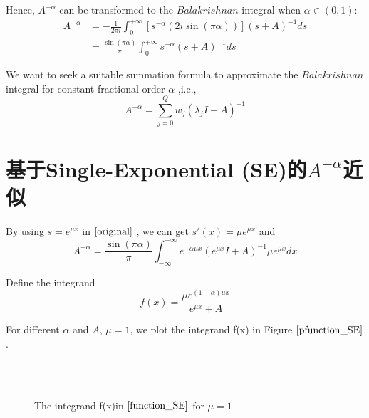 Hence, $A^{-\alpha}$ can be transformed to the $Balakrishnan$  integral \cite{Balakrishnan1960FractionalPO} when $\alpha \in(0,1)$:
\begin{equation}
	\begin{aligned}
	A^{-\alpha}& =-\frac{1}{2 \pi i} \int_{0}^{+\infty}[s^{-\alpha}(2 i \sin(\pi\alpha))](s+A)^{-1} d s\\
	& =\frac{\sin(\pi \alpha)}{\pi} \int_{0}^{+\infty} s^{-\alpha}(s+A)^{-1} d s
\label{original}
\end{aligned}
\end{equation}

We want to seek a suitable summation formula to approximate the  $Balakrishnan$  integral for constant fractional order $\alpha$ ,i.e.,
\begin{equation}
{A}^{-\alpha}=\sum_{j=0}^{Q}w_j(\lambda_jI+A)^{-1}
\end{equation}


\section{基于Single-Exponential (SE)的$A^{-\alpha}$近似}


By using  $s=e^{\mu x}$ in $\eqref{original}$\cite{Harizanov2020ASO} , we can get $s'(x)=\mu e^{\mu x}$ and
\begin{equation}
{A}^{-\alpha}=\frac{\sin(\pi \alpha)}{\pi}\int_{-\infty}^{+\infty}e^{-\alpha\mu x}(e^{\mu x} I+A)^{-1}\mu e^{\mu x} dx
\label{expu}
\end{equation}

Define the integrand
\begin{equation}
f(x)=\frac{\mu e^{(1-\alpha)\mu x}}{e^{\mu x}+A}
\label{function_SE}
\end{equation}

For different $\alpha$ and $A$, $\mu=1$, we plot the integrand f(x) in Figure $\ref{pfunction_SE}$.
\begin{figure}[htbp]
\centering
{}
~~
~~
\\
~~
~~
\caption{The integrand f(x)in $\eqref{function_SE}$ for $\mu=1$}
\label{pfunction_SE}
\end{figure}




